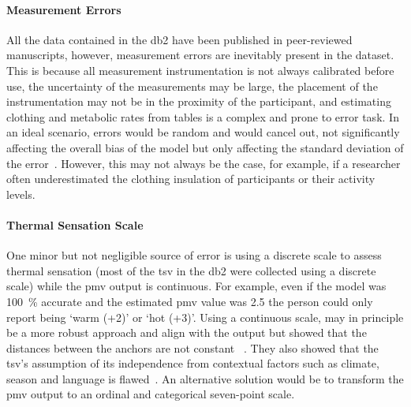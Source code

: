 \paragraph{Measurement Errors}
All the data contained in the \ac{db2} have been published in peer-reviewed manuscripts, however, measurement errors are inevitably present in the dataset.
This is because all measurement instrumentation is not always calibrated before use, the uncertainty of the measurements may be large, the placement of the instrumentation may not be in the proximity of the participant, and estimating clothing and metabolic rates from tables is a complex and prone to error task.
In an ideal scenario, errors would be random and would cancel out, not significantly affecting the overall bias of the model but only affecting the standard deviation of the error~\cite{Humphreys2002}.
However, this may not always be the case, for example, if a researcher often underestimated the clothing insulation of participants or their activity levels.

\paragraph{Thermal Sensation Scale}
One minor but not negligible source of error is using a discrete scale to assess thermal sensation (most of the \ac{tsv} in the \ac{db2} were collected using a discrete scale) while the \ac{pmv} output is continuous.
For example, even if the model was 100~\% accurate and the estimated \ac{pmv} value was \num{2.5} the person could only report being `warm (+2)' or `hot (+3)'.
Using a continuous scale, may in principle be a more robust approach and align with the output but  showed that the distances between the anchors are not constant ~\cite{schweiker2019scales, schweiker2020evaluating}.
They also showed that the \ac{tsv}'s assumption of its independence from contextual factors such as climate, season and language is flawed~\cite{schweiker2019scales, schweiker2020evaluating}.
An alternative solution would be to transform the \ac{pmv} output to an ordinal and categorical seven-point scale.


